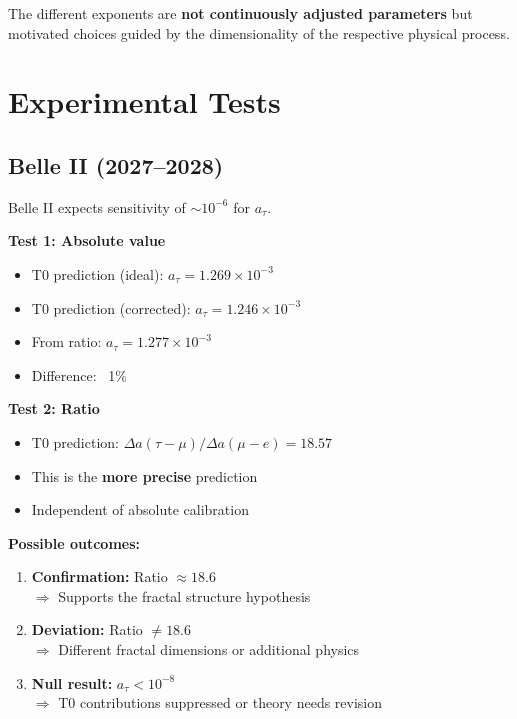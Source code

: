 	The different exponents are \textbf{not continuously adjusted parameters} but motivated choices guided by the dimensionality of the respective physical process.
	
	\section{Experimental Tests}
	
	\subsection{Belle II (2027--2028)}
	
	Belle II expects sensitivity of $\sim 10^{-6}$ for $a_\tau$.
	
	\textbf{Test 1: Absolute value}
	\begin{itemize}
		\item T0 prediction (ideal): $a_\tau = 1.269 \times 10^{-3}$
		\item T0 prediction (corrected): $a_\tau = 1.246 \times 10^{-3}$
		\item From ratio: $a_\tau = 1.277 \times 10^{-3}$
		\item Difference: ~1\%
	\end{itemize}
	
	\textbf{Test 2: Ratio}
	\begin{itemize}
		\item T0 prediction: $\Delta a(\tau - \mu) / \Delta a(\mu - e) = 18.57$
		\item This is the \textbf{more precise} prediction
		\item Independent of absolute calibration
	\end{itemize}
	
	\textbf{Possible outcomes:}
	\begin{enumerate}
		\item \textbf{Confirmation:} Ratio $\approx 18.6$ \\
		$\Rightarrow$ Supports the fractal structure hypothesis
		
		\item \textbf{Deviation:} Ratio $\neq 18.6$ \\
		$\Rightarrow$ Different fractal dimensions or additional physics
		
		\item \textbf{Null result:} $a_\tau < 10^{-8}$ \\
		$\Rightarrow$ T0 contributions suppressed or theory needs revision
	\end{enumerate}
	
